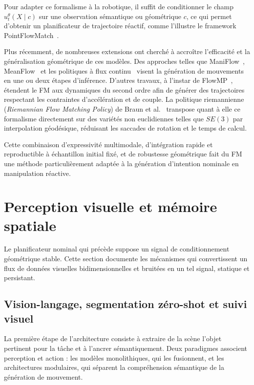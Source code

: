 Pour adapter ce formalisme à la robotique, il suffit de conditionner le champ $u_t^{\theta}(X \mid c)$ sur une observation sémantique ou géométrique $c$, ce qui permet d'obtenir un planificateur de trajectoire réactif, comme l'illustre le framework PointFlowMatch~\cite{Chisari2024Manipulation}.

Plus récemment, de nombreuses extensions ont cherché à accroître l'efficacité et la généralisation géométrique de ces modèles. Des approches telles que ManiFlow~\cite{Yan2025Maniflow}, MeanFlow~\cite{Geng2025Mean,Fang2026Omp} et les politiques à flux continu~\cite{Jiang2025Streaming} visent la génération de mouvements en une ou deux étapes d'inférence. D'autres travaux, à l'instar de FlowMP~\cite{Nguyen2025Flowmp,Soleymanzadeh2026Flow}, étendent le \ac{FM} aux dynamiques du second ordre afin de générer des trajectoires respectant les contraintes d'accélération et de couple. La politique riemannienne (\textit{Riemannian Flow Matching Policy}) de Braun et al.~\cite{Braun2024Riemannian} transpose quant à elle ce formalisme directement sur des variétés non euclidiennes telles que $SE(3)$ par interpolation géodésique, réduisant les saccades de rotation et le temps de calcul.

Cette combinaison d'expressivité multimodale, d'intégration rapide et reproductible à échantillon initial fixé, et de robustesse géométrique fait du \ac{FM} une méthode particulièrement adaptée à la génération d'intention nominale en manipulation réactive.

\section{Perception visuelle et mémoire spatiale}

Le planificateur nominal qui précède suppose un signal de conditionnement géométrique stable. Cette section documente les mécanismes qui convertissent un flux de données visuelles bidimensionnelles et bruitées en un tel signal, statique et persistant.

\subsection{Vision-langage, segmentation zéro-shot et suivi visuel}
La première étape de l'architecture consiste à extraire de la scène l'objet pertinent pour la tâche et à l'ancrer sémantiquement. Deux paradigmes associent perception et action : les modèles monolithiques, qui les fusionnent, et les architectures modulaires, qui séparent la compréhension sémantique de la génération de mouvement.

